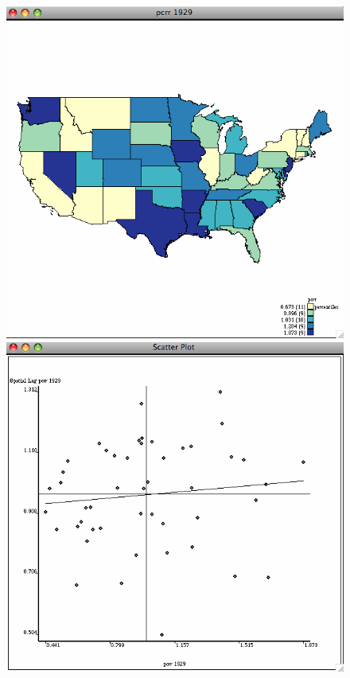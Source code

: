 \documentclass[nototal,handout]{beamer}
\begin{document}
\begin{frame}
\begin{figure}[ht]
\begin{minipage}[b]{0.4\linewidth}
  \end{minipage}
 \begin{minipage}[b]{0.4\linewidth}
  \centering
  \includegraphics[scale=0.20]{income29random.png}
  \end{minipage}
 \begin{minipage}[b]{0.4\linewidth}
  \centering
  \includegraphics[scale=0.20]{moran29random.png}
  \end{minipage}
  \end{figure}
 \end{frame} 
\end{document}
